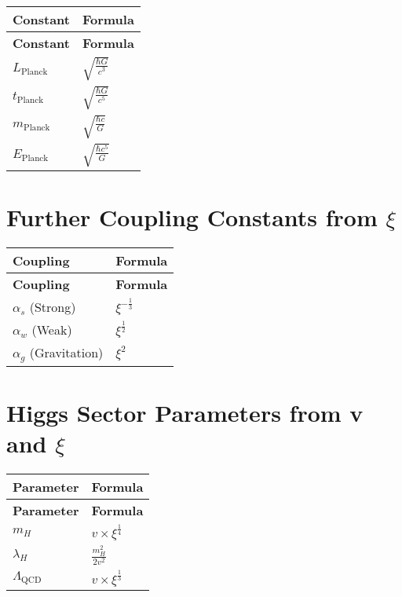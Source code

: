 \documentclass[12pt,a4paper]{article}
\begin{document}
	\begin{longtable}{|p{3cm}|p{4cm}|}
		\hline
		\textbf{Constant} & \textbf{Formula} \\
		\hline
		\endfirsthead
		\hline
		\textbf{Constant} & \textbf{Formula} \\
		\hline
		\endhead
		\(L_{\text{Planck}}\) & \(\sqrt{\frac{\hbar G}{c^{3}}}\) \\
		\hline
		\(t_{\text{Planck}}\) & \(\sqrt{\frac{\hbar G}{c^{5}}}\) \\
		\hline
		\(m_{\text{Planck}}\) & \(\sqrt{\frac{\hbar c}{G}}\) \\
		\hline
		\(E_{\text{Planck}}\) & \(\sqrt{\frac{\hbar c^{5}}{G}}\) \\
		\hline
	\end{longtable}
	
	\section{Further Coupling Constants from \(\xi\)}
	
	\begin{longtable}{|p{3cm}|p{3cm}|}
		\hline
		\textbf{Coupling} & \textbf{Formula} \\
		\hline
		\endfirsthead
		\hline
		\textbf{Coupling} & \textbf{Formula} \\
		\hline
		\endhead
		\(\alpha_s\) (Strong) & \(\xi^{-\frac{1}{3}}\) \\
		\hline
		\(\alpha_w\) (Weak) & \(\xi^{\frac{1}{2}}\) \\
		\hline
		\(\alpha_g\) (Gravitation) & \(\xi^{2}\) \\
		\hline
	\end{longtable}
	
	\section{Higgs Sector Parameters from v and \(\xi\)}
	
	\begin{longtable}{|p{3cm}|p{4cm}|}
		\hline
		\textbf{Parameter} & \textbf{Formula} \\
		\hline
		\endfirsthead
		\hline
		\textbf{Parameter} & \textbf{Formula} \\
		\hline
		\endhead
		\(m_H\) & \(v \times \xi^{\frac{1}{4}}\) \\
		\hline
		\(\lambda_H\) & \(\frac{m_H^{2}}{2v^{2}}\) \\
		\hline
		\(\Lambda_{\text{QCD}}\) & \(v \times \xi^{\frac{1}{3}}\) \\
		\hline
	\end{longtable}
	
\end{document}
